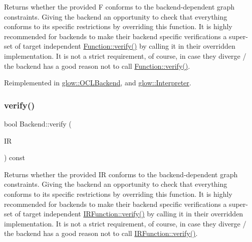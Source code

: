 \begin{DoxyReturn}{Returns}
whether the provided {\ttfamily F} conforms to the backend-\/dependent graph constraints. Giving the backend an opportunity to check that everything conforms to its specific restrictions by overriding this function. It is highly recommended for backends to make their backend specific verifications a super-\/set of target independent \hyperlink{classglow_1_1_function_a73897a61138cf69eacb41357839815df}{Function\+::verify()} by calling it in their overridden implementation. It is not a strict requirement, of course, in case they diverge / the backend has a good reason not to call \hyperlink{classglow_1_1_function_a73897a61138cf69eacb41357839815df}{Function\+::verify()}. 
\end{DoxyReturn}


Reimplemented in \hyperlink{classglow_1_1_o_c_l_backend_a4e7432c28997e04d398ab5310e7f64f0}{glow\+::\+O\+C\+L\+Backend}, and \hyperlink{classglow_1_1_interpreter_a9dd7a307318bd87414bac5d8cabf5a6f}{glow\+::\+Interpreter}.

\mbox{\label{classglow_1_1_backend_a19b5580a7274a1457bcdf3fc05f98cbd}} 
\subsubsection{\texorpdfstring{verify()}{verify()}\hspace{0.1cm}{\footnotesize\ttfamily [2/2]}}
{\footnotesize\ttfamily bool Backend\+::verify (\begin{DoxyParamCaption}\item[{const \hyperlink{classglow_1_1_i_r_function}{I\+R\+Function} \&}]{IR }\end{DoxyParamCaption}) const\hspace{0.3cm}{\ttfamily [virtual]}}

\begin{DoxyReturn}{Returns}
whether the provided {\ttfamily IR} conforms to the backend-\/dependent graph constraints. Giving the backend an opportunity to check that everything conforms to its specific restrictions by overriding this function. It is highly recommended for backends to make their backend specific verifications a super-\/set of target independent \hyperlink{classglow_1_1_i_r_function_a3add272c76243daef4950bf3ff68338c}{I\+R\+Function\+::verify()} by calling it in their overridden implementation. It is not a strict requirement, of course, in case they diverge / the backend has a good reason not to call \hyperlink{classglow_1_1_i_r_function_a3add272c76243daef4950bf3ff68338c}{I\+R\+Function\+::verify()}. 
\end{DoxyReturn}


